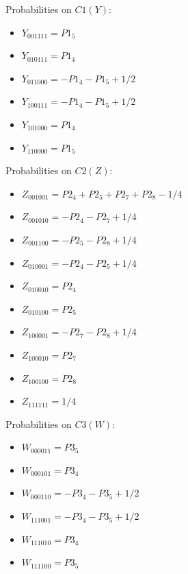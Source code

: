 \documentclass[11pt]{article}
\begin{document}
Probabilities on $C1 (Y)$:
\begin{itemize}
    \item $Y_{001111} = P1_5$
    \item $Y_{010111} = P1_4$
    \item $Y_{011000} = -P1_4 - P1_5 + 1/2$
    \item $Y_{100111} = -P1_4 - P1_5 + 1/2$
    \item $Y_{101000} = P1_4$
    \item $Y_{110000} = P1_5$
\end{itemize}

Probabilities on $C2 (Z)$:
\begin{itemize}
    \item $Z_{001001} = P2_4 + P2_5 + P2_7 + P2_8 - 1/4$
    \item $Z_{001010} = -P2_4 - P2_7 + 1/4$
    \item $Z_{001100} = -P2_5 - P2_8 + 1/4$
    \item $Z_{010001} = -P2_4 - P2_5 + 1/4$
    \item $Z_{010010} = P2_4$
    \item $Z_{010100} = P2_5$
    \item $Z_{100001} = -P2_7 - P2_8 + 1/4$
    \item $Z_{100010} = P2_7$
    \item $Z_{100100} = P2_8$
    \item $Z_{111111} = 1/4$
\end{itemize}

Probabilities on $C3 (W)$:
\begin{itemize}
    \item $W_{000011} = P3_5$
    \item $W_{000101} = P3_4$
    \item $W_{000110} = -P3_4 - P3_5 + 1/2$
    \item $W_{111001} = -P3_4 - P3_5 + 1/2$
    \item $W_{111010} = P3_4$
    \item $W_{111100} = P3_5$
\end{itemize}
\end{document}
